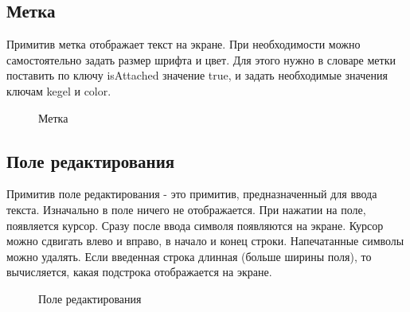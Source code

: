 \documentclass[14pt]{extarticle}
\begin{document}
	\subsection{Метка}
		Примитив метка отображает текст на экране. При необходимости можно самостоятельно задать размер шрифта и цвет. Для этого нужно в словаре метки поставить по ключу isAttached значение true, и задать необходимые значения ключам kegel и color. 
		\begin{figure}[h]
		\caption{ Метка }
		\label{ris:image}
		\end{figure}	

	\subsection{Поле редактирования}
		Примитив поле редактирования - это примитив, предназначенный для ввода текста. Изначально в поле ничего не отображается. При нажатии на поле, появляется курсор. Сразу после ввода символя появляются на экране. Курсор можно сдвигать влево и вправо, в начало и конец строки. Напечатанные символы можно удалять. Если введенная строка длинная (больше ширины поля), то вычисляется, какая подстрока отображается на экране. 
		\begin{figure}[h]
		\caption{ Поле редактирования }
		\label{ris:image}
		\end{figure}	
\end{document}
